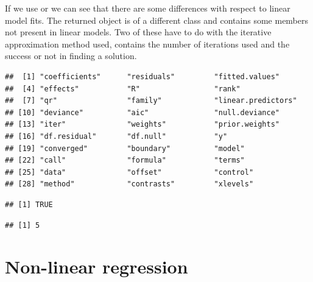 \documentclass[krantz2]{krantz}\usepackage{knitr}
\begin{document}
\begin{explainbox}
If we use  or  we can see that there are some differences with respect to linear model fits. The returned object is of a different class and contains some members not present in linear models. Two of these have to do with the iterative approximation method used,  contains the number of iterations used  and  the success or not in finding a solution.

\begin{knitrout}\footnotesize
{}\color{fgcolor}\begin{kframe}
\begin{alltt}
\end{alltt}
\begin{verbatim}
##  [1] "coefficients"      "residuals"         "fitted.values"    
##  [4] "effects"           "R"                 "rank"             
##  [7] "qr"                "family"            "linear.predictors"
## [10] "deviance"          "aic"               "null.deviance"    
## [13] "iter"              "weights"           "prior.weights"    
## [16] "df.residual"       "df.null"           "y"                
## [19] "converged"         "boundary"          "model"            
## [22] "call"              "formula"           "terms"            
## [25] "data"              "offset"            "control"          
## [28] "method"            "contrasts"         "xlevels"
\end{verbatim}
\begin{alltt}
\hlopt{$}
\end{alltt}
\begin{verbatim}
## [1] TRUE
\end{verbatim}
\begin{alltt}
\hlopt{$}
\end{alltt}
\begin{verbatim}
## [1] 5
\end{verbatim}
\end{kframe}
\end{knitrout}
\end{explainbox}


\section{Non-linear regression}\label{sec:stat:NLS}
%
%
\end{document}
